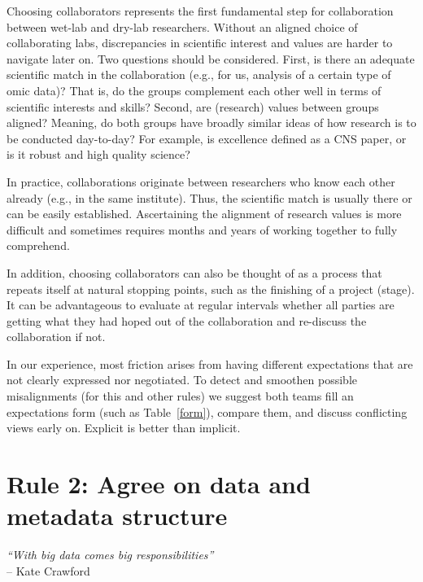 \documentclass{article}
\begin{document}
Choosing collaborators represents the first fundamental step for collaboration between wet-lab and dry-lab researchers. Without an aligned choice of collaborating labs, discrepancies in scientific interest and values are harder to navigate later on. Two questions should be considered. First, is there an adequate scientific match in the collaboration (e.g., for us, analysis of a certain type of omic data)? That is, do the groups complement each other well in terms of scientific interests and skills? Second, are (research) values between groups aligned? Meaning, do both groups have broadly similar ideas of how research is to be conducted day-to-day? For example, is excellence defined as a CNS paper, or is it robust and high quality science?

In practice, collaborations originate between researchers who know each other already (e.g., in the same institute). Thus, the scientific match is usually there or can be easily established. Ascertaining the alignment of research values is more difficult and sometimes requires months and years of working together to fully comprehend. 

In addition, choosing collaborators can also be thought of as a process that repeats itself at natural stopping points, such as the finishing of a project (stage). It can be advantageous to evaluate at regular intervals whether all parties are getting what they had hoped out of the collaboration and re-discuss the collaboration if not.

In our experience, most friction arises from having different expectations that are not clearly expressed nor negotiated. To detect and smoothen possible misalignments (for this and other rules) we suggest both teams fill an expectations form (such as Table~\ref{form}), compare them, and discuss conflicting views early on. Explicit is better than implicit. 

\section*{Rule 2: Agree on data and metadata structure} %
\label{rule2_data}

\begin{flushright}
\rightskip=1cm\textit{``With big data comes big responsibilities''} \\
\vspace{.2em}
\rightskip=0cm -- Kate Crawford
\end{flushright}
\end{document}

